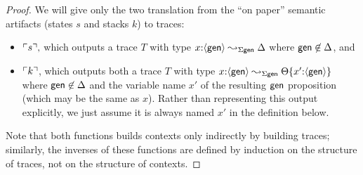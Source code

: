 \begin{proof}
We will give only the two translation from the ``on paper''
semantic artifacts (states $s$ and stacks $k$) to traces:
\begin{itemize}
\item ${\ulcorner{s}\urcorner},$ which outputs
a trace $T$ with type $x{:}\langle {\sf gen} \rangle \leadsto_{\Sigma\sf gen} \Delta$
where ${\sf gen} \not\in \Delta$, and 
\item ${\ulcorner{k}\urcorner}$, which outputs
both a trace $T$ with type 
$x{:}\langle {\sf gen} \rangle
  \leadsto_{\Sigma\sf gen} {\Theta}\{{x'{:}\langle {\sf gen} \rangle}\}$ where
${\sf gen} \not\in \Delta$ and the variable name $x'$ of the resulting
${\sf gen}$ proposition (which may be the same as $x$). Rather than 
representing this output explicitly, we just assume it is always
named $x'$ in the definition below.  
\end{itemize}
Note that both functions builds contexts only indirectly by building 
traces; similarly, the inverses of these functions are defined by induction
on the structure of traces, not on the structure of contexts.
\end{proof}
